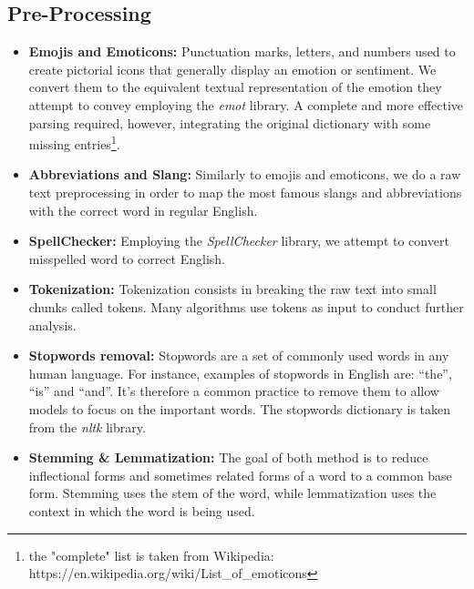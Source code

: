 \documentclass{article}
\begin{document}
    
    
    \subsection{Pre-Processing}
    \label{pre_processing}
	\begin{itemize}
		\item \textbf{Emojis and Emoticons:} Punctuation marks, letters, and numbers used to create pictorial icons that generally display an emotion or sentiment. We convert them to the equivalent textual representation of the emotion they attempt to convey employing the \textit{emot} library. A complete and more effective parsing required, however, integrating the original dictionary with some missing entries\footnote{the "complete" list is taken from Wikipedia: https://en.wikipedia.org/wiki/List\_of\_emoticons}.
		\item \textbf{Abbreviations and Slang:} Similarly to emojis and emoticons, we do a raw text preprocessing in order to map the most famous slangs and abbreviations with the correct word in regular English.
		\item \textbf{SpellChecker:} Employing the \textit{SpellChecker} library, we attempt to convert misspelled word to correct English.
		\item \textbf{Tokenization:} Tokenization consists in breaking the raw text into small chunks called tokens. Many algorithms use tokens as input to conduct further analysis.
        \item \textbf{Stopwords removal:} Stopwords are a set of commonly used words in any human language. For instance, examples of stopwords in English are: “the”, “is” and “and”. It's therefore a common practice to remove them to allow models to focus on the important words. The stopwords dictionary is taken from the \textit{nltk} library. 
		
		\item \textbf{Stemming \& Lemmatization:} The goal of both method is to reduce inflectional forms and sometimes related forms of a word to a common base form. Stemming uses the stem of the word, while lemmatization uses the context in which the word is being used. 
		
	\end{itemize}
\end{document}
